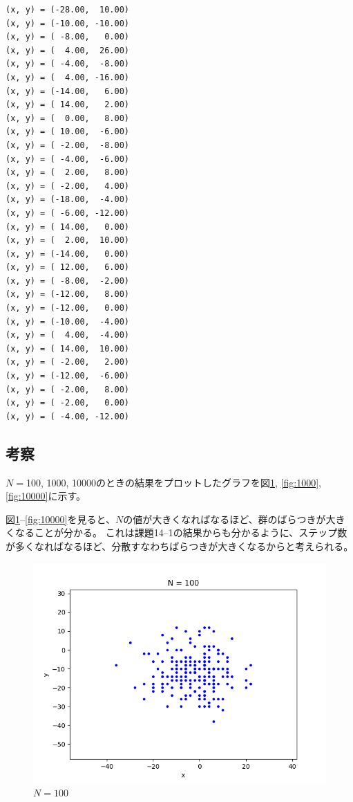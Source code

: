\documentclass[a4j,titlepage]{jsarticle}
\begin{document}
\begin{lstlisting}[style=text,caption=課題14--2の実行結果,label=lst:kekka14-2]
(x, y) = (-28.00,  10.00)
(x, y) = (-10.00, -10.00)
(x, y) = ( -8.00,   0.00)
(x, y) = (  4.00,  26.00)
(x, y) = ( -4.00,  -8.00)
(x, y) = (  4.00, -16.00)
(x, y) = (-14.00,   6.00)
(x, y) = ( 14.00,   2.00)
(x, y) = (  0.00,   8.00)
(x, y) = ( 10.00,  -6.00)
(x, y) = ( -2.00,  -8.00)
(x, y) = ( -4.00,  -6.00)
(x, y) = (  2.00,   8.00)
(x, y) = ( -2.00,   4.00)
(x, y) = (-18.00,  -4.00)
(x, y) = ( -6.00, -12.00)
(x, y) = ( 14.00,   0.00)
(x, y) = (  2.00,  10.00)
(x, y) = (-14.00,   0.00)
(x, y) = ( 12.00,   6.00)
(x, y) = ( -8.00,  -2.00)
(x, y) = (-12.00,   8.00)
(x, y) = (-12.00,   0.00)
(x, y) = (-10.00,  -4.00)
(x, y) = (  4.00,  -4.00)
(x, y) = ( 14.00,  10.00)
(x, y) = ( -2.00,   2.00)
(x, y) = (-12.00,  -6.00)
(x, y) = ( -2.00,   8.00)
(x, y) = ( -2.00,   0.00)
(x, y) = ( -4.00, -12.00)
\end{lstlisting}

\subsection{考察}
$N=$100, 1000, 10000のときの結果をプロットしたグラフを図\ref{fig:100}, \ref{fig:1000}, \ref{fig:10000}に示す。

図\ref{fig:100}--\ref{fig:10000}を見ると、$N$の値が大きくなればなるほど、群のばらつきが大きくなることが分かる。
これは課題14--1の結果からも分かるように、ステップ数が多くなればなるほど、分散すなわちばらつきが大きくなるからと考えられる。

\begin{figure}[H]
  \centering
  \includegraphics[width=13cm]{n100.png}
  \caption{$N = 100$}
  \label{fig:100}
\end{figure}
\end{document}
